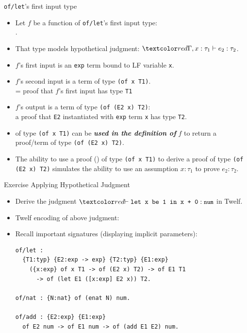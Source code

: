 \documentclass{beamer}
\renewcommand{\emph}[1]{\textbf{\textit{#1}}}
\begin{document}
\begin{frame}{\texttt{of/let}'s first input type}
\begin{itemize}
\item
Let $f$ be a function of \texttt{of/let}'s first input type: \\
.

\item That type models hypothetical judgment:
$\cemph{\Gamma , x : \tau_1 \vdash e_2 : \tau_2}$.

\pause
\item $f$'s first input is an \texttt{exp} term bound to LF variable \texttt{x}.
\pause
\item $f$'s second input is a term \texttt{} of type \texttt{(of x T1)}. \\
\texttt{} = proof that $f$'s first input has type \texttt{T1}
\pause
\item $f$'s output is a term of type \texttt{(of (E2 x) T2)}: \\
a proof that \texttt{E2} instantiated with \texttt{exp} term
\texttt{x} has type \texttt{T2}.

\pause
\item \texttt{} of type \texttt{(of x T1)} can be
\emph{used in the definition of} $f$
to return a proof/term of type \texttt{(of (E2 x) T2)}.

\item The ability to use a proof (\texttt{}) of type
\texttt{(of x T1)} to derive a proof of type \texttt{(of (E2 x) T2)}
simulates the ability to use an assumption $x : \tau_1$ to prove $e_2 : \tau_2$.
\end{itemize}
\end{frame}


\begin{frame}[containsverbatim]{Exercise Applying Hypothetical Judgment}
\begin{itemize}
\item Derive the judgment
$\cemph{\vdash \texttt{let x be 1 in x + 0} : \code{num}}$
in Twelf.

\item Twelf encoding of above judgment: \\

\item Recall important signatures (displaying implicit parameters):

\begin{verbatim}
of/let :
  {T1:typ} {E2:exp -> exp} {T2:typ} {E1:exp}
    ({x:exp} of x T1 -> of (E2 x) T2) -> of E1 T1
      -> of (let E1 ([x:exp] E2 x)) T2.

of/nat : {N:nat} of (enat N) num.

of/add : {E2:exp} {E1:exp}
  of E2 num -> of E1 num -> of (add E1 E2) num.
\end{verbatim}

\end{itemize}
\end{frame}
\end{document}
